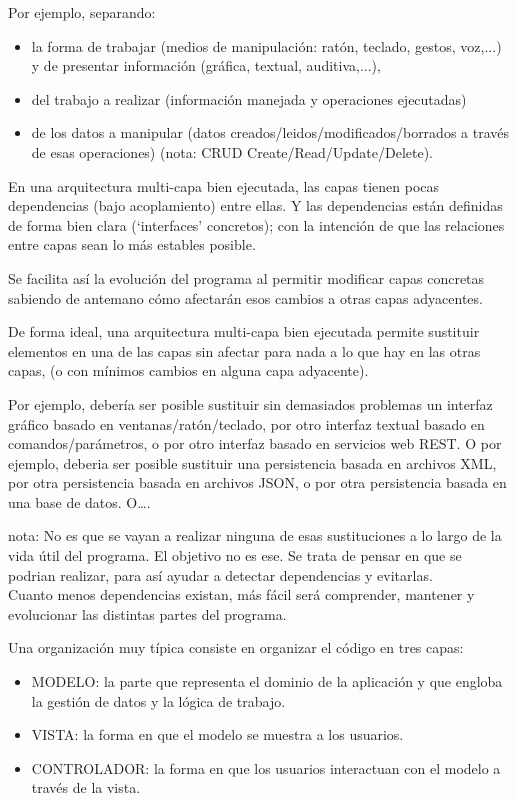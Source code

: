 \documentclass[spanish,12pt,a4paper,final,oneside]{book}
\begin{document}
Por ejemplo, separando:
\begin{itemize}
\item la forma de trabajar (medios de manipulación: ratón, teclado, gestos, voz,...) y de presentar información (gráfica, textual, auditiva,...),
\item del trabajo a realizar (información manejada y operaciones ejecutadas) 
\item de los datos a manipular (datos creados/leidos/modificados/borrados a través de esas operaciones) (nota: CRUD Create/Read/Update/Delete).
\end{itemize}

En una arquitectura multi-capa bien ejecutada, las capas tienen pocas dependencias (bajo acoplamiento) entre ellas. Y las dependencias están definidas de forma bien clara (`interfaces' concretos); con la intención de que las relaciones entre capas sean lo más estables posible.

Se facilita así la evolución del programa al permitir modificar capas concretas sabiendo de antemano cómo afectarán esos cambios a otras capas adyacentes.

De forma ideal, una arquitectura multi-capa bien ejecutada permite sustituir elementos en una de las capas sin afectar para nada a lo que hay en las otras capas, (o con mínimos cambios en alguna capa adyacente). 

Por ejemplo, debería ser posible sustituir sin demasiados problemas un interfaz gráfico basado en ventanas/ratón/teclado, por otro interfaz textual basado en comandos/parámetros, o por otro interfaz basado en servicios web {\footnotesize REST}. O por ejemplo, deberia ser posible sustituir una persistencia basada en archivos {\footnotesize XML}, por otra persistencia basada en archivos {\footnotesize JSON}, o por otra persistencia basada en una base de datos. O\ldots.

nota: No es que se vayan a realizar ninguna de esas sustituciones a lo largo de la vida útil del programa. El objetivo no es ese. Se trata de pensar en que se podrian realizar, para así ayudar a detectar dependencias y evitarlas.
\\Cuanto menos dependencias existan, más fácil será  comprender, mantener y evolucionar las distintas partes del programa. 

\vspace{1cm}

Una organización muy típica consiste en organizar el código en tres capas:
\begin{itemize}
\item MODELO: la parte que representa el dominio de la aplicación y que engloba la gestión de datos y la lógica de trabajo.
\item VISTA: la forma en que el modelo se muestra a los usuarios.
\item CONTROLADOR: la forma en que los usuarios interactuan con el modelo  a través de la vista.
\end{itemize}
\end{document}
